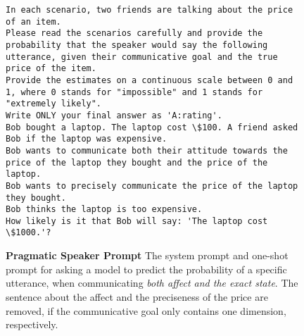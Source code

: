 \begin{figure}[htpb]
\centering
\begin{tcolorbox}[
width=1\linewidth,
title={Pragmatic Speaker Prompt}]
\fontsize{5pt}{5pt}\selectfont
\ttfamily
\begin{lstlisting}[language={}]
In each scenario, two friends are talking about the price of an item.
Please read the scenarios carefully and provide the probability that the speaker would say the following utterance, given their communicative goal and the true price of the item.
Provide the estimates on a continuous scale between 0 and 1, where 0 stands for "impossible" and 1 stands for "extremely likely".
Write ONLY your final answer as 'A:rating'.
Bob bought a laptop. The laptop cost \$100. A friend asked Bob if the laptop was expensive. 
Bob wants to communicate both their attitude towards the price of the laptop they bought and the price of the laptop. 
Bob wants to precisely communicate the price of the laptop they bought.
Bob thinks the laptop is too expensive.
How likely is it that Bob will say: 'The laptop cost \$1000.'?
\end{lstlisting}
\end{tcolorbox}
\caption{\textbf{Pragmatic Speaker Prompt}
The system prompt and one-shot prompt for asking a model to predict the probability of a specific utterance, when communicating \textit{both affect and the exact state}. The sentence about the affect and the preciseness of the price are removed, if the communicative goal only contains one dimension, respectively.}
\label{prompt:affect}
\end{figure}